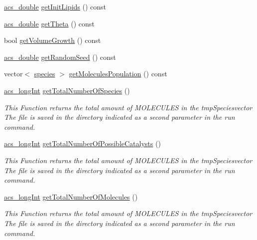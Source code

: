 \begin{DoxyCompactItemize}
\item 
\hyperlink{a00024_ab776853a005fcbf56af0424a2a4dd607}{acs\-\_\-double} \hyperlink{a00011_a94a7b04aea7b0b16735538028516bdd3}{get\-Init\-Lipids} () const 
\item 
\hyperlink{a00024_ab776853a005fcbf56af0424a2a4dd607}{acs\-\_\-double} \hyperlink{a00011_adb5b964f625b9e9a85b9b44b7a42682b}{get\-Theta} () const 
\item 
bool \hyperlink{a00011_a5e8b4ea54224563343199a15f68dee8a}{get\-Volume\-Growth} () const 
\item 
\hyperlink{a00024_ab776853a005fcbf56af0424a2a4dd607}{acs\-\_\-double} \hyperlink{a00011_ab6952f7f6fd971ece0a8661733cfc2b3}{get\-Random\-Seed} () const 
\item 
vector$<$ \hyperlink{a00022}{species} $>$ \hyperlink{a00011_adb12eb52af74ea1fdfe0cd195109fe83}{get\-Molecules\-Population} () const 
\item 
\hyperlink{a00024_a19319d75f02db4308bc5c0026d98cd85}{acs\-\_\-long\-Int} \hyperlink{a00011_a7a321296874fa1320da225cdbbf56a64}{get\-Total\-Number\-Of\-Species} ()
\begin{DoxyCompactList}\small\item\em This Function returns the total amount of M\-O\-L\-E\-C\-U\-L\-E\-S in the tmp\-Speciesvector The file is saved in the directory indicated as a second parameter in the run command. \end{DoxyCompactList}\item 
\hyperlink{a00024_a19319d75f02db4308bc5c0026d98cd85}{acs\-\_\-long\-Int} \hyperlink{a00011_a8796aead7bcc4a3f91eec7bc908dfa5b}{get\-Total\-Number\-Of\-Possible\-Catalysts} ()
\begin{DoxyCompactList}\small\item\em This Function returns the total amount of M\-O\-L\-E\-C\-U\-L\-E\-S in the tmp\-Speciesvector The file is saved in the directory indicated as a second parameter in the run command. \end{DoxyCompactList}\item 
\hyperlink{a00024_a19319d75f02db4308bc5c0026d98cd85}{acs\-\_\-long\-Int} \hyperlink{a00011_a57e7ac49955f4717096cb6696ee03a61}{get\-Total\-Number\-Of\-Molecules} ()
\begin{DoxyCompactList}\small\item\em This Function returns the total amount of M\-O\-L\-E\-C\-U\-L\-E\-S in the tmp\-Speciesvector The file is saved in the directory indicated as a second parameter in the run command. \end{DoxyCompactList}\item 

\end{DoxyCompactItemize}
